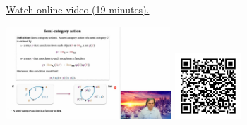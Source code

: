 
\begin{minipage}{10cm}
    \href{https://act4e-spring21.netlify.app/videos/spring2021-functors:semi-and-fun.html}{Watch online video (19 minutes).}
        
    \href{https://act4e-spring21.netlify.app/videos/spring2021-functors:semi-and-fun.html}{\includegraphics[height=3.5cm]{spring2021-functors:semi-and-fun/thumbnails.jpg}}
    \href{https://act4e-spring21.netlify.app/videos/spring2021-functors:semi-and-fun.html}{\includegraphics[height=2.5cm]{spring2021-functors:semi-and-fun/qrcode.png}}
\end{minipage}
